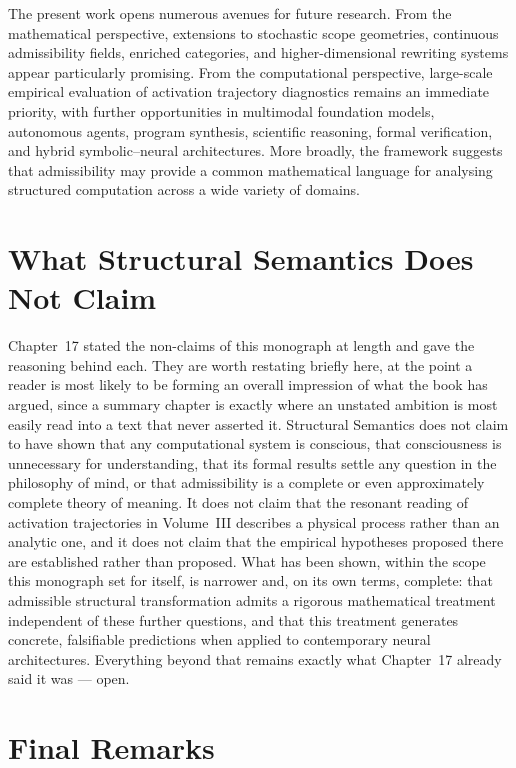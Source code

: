 \documentclass[11pt,twoside,openright]{book}
\numberwithin{equation}{chapter}
\theoremstyle{definition}
\theoremstyle{plain}
\theoremstyle{remark}
\theoremstyle{definition}
\begin{document}
The present work opens numerous avenues for future research. From the
mathematical perspective, extensions to stochastic scope geometries,
continuous admissibility fields, enriched categories, and
higher-dimensional rewriting systems appear particularly promising. From
the computational perspective, large-scale empirical evaluation of
activation trajectory diagnostics remains an immediate priority, with
further opportunities in multimodal foundation models, autonomous agents,
program synthesis, scientific reasoning, formal verification, and hybrid
symbolic--neural architectures. More broadly, the framework suggests that
admissibility may provide a common mathematical language for analysing
structured computation across a wide variety of domains.

\section{What Structural Semantics Does Not Claim}

Chapter~17 stated the non-claims of this monograph at length and gave
the reasoning behind each. They are worth restating briefly here, at the
point a reader is most likely to be forming an overall impression of
what the book has argued, since a summary chapter is exactly where an
unstated ambition is most easily read into a text that never asserted
it. Structural Semantics does not claim to have shown that any
computational system is conscious, that consciousness is unnecessary for
understanding, that its formal results settle any question in the
philosophy of mind, or that admissibility is a complete or even
approximately complete theory of meaning. It does not claim that the
resonant reading of activation trajectories in Volume~III describes a
physical process rather than an analytic one, and it does not claim that
the empirical hypotheses proposed there are established rather than
proposed. What has been shown, within the scope this monograph set for
itself, is narrower and, on its own terms, complete: that admissible
structural transformation admits a rigorous mathematical treatment
independent of these further questions, and that this treatment
generates concrete, falsifiable predictions when applied to contemporary
neural architectures. Everything beyond that remains exactly what
Chapter~17 already said it was --- open.

\section{Final Remarks}
\end{document}
